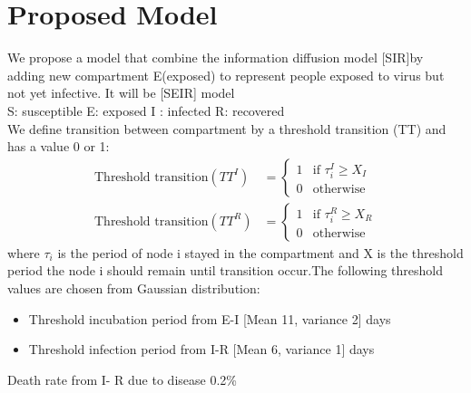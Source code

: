 \documentclass[conference]{IEEEtran}
\begin{document}
\section{Proposed Model} %
We propose a model that combine the information diffusion model [SIR]by adding new compartment E(exposed) to represent people exposed to virus but not yet infective. It will  be [SEIR] model\\
S: susceptible  E: exposed  I : infected  R: recovered\\
We define transition between compartment by a threshold transition (TT) and has a value 0 or 1:
\begin{align*}
    \text{Threshold transition}(TT^{I}) &=%
    \begin{cases}
    1 &\text{if } \tau_{i}^{I} \geq X_{I}\\
    0 &\text{otherwise}
    \end{cases}\\
    \text{Threshold transition}(TT^{R}) &=%
    \begin{cases}
    1 &\text{if } \tau_{i}^{R} \geq X_{R}\\
    0 &\text{otherwise}
    \end{cases}
\end{align*}
where $\tau_{i}$ is the period of node i stayed in the compartment and X is the threshold period the node i should remain until transition occur.The following threshold values are chosen from Gaussian distribution:
\begin{itemize}
    \item Threshold incubation period from E-I  [Mean 11, variance 2] days
    \item Threshold infection period from I-R  [Mean 6, variance 1] days
\end{itemize}
Death rate from I- R  due to disease 0.2\%
\end{document}
